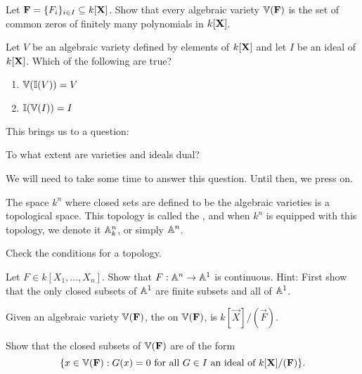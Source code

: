 \documentclass{ximera}
\begin{document}
\begin{exercise}
  Let $\mathbf{F} = \{F_i\}_{i\in I}\subseteq k[\mathbf X]$. Show that every
  algebraic variety $\mathbb V(\mathbf{F})$ is the set of common zeros of
  finitely many polynomials in $k[\mathbf X]$.
\end{exercise}

\begin{exercise}
  Let $V$ be an algebraic variety defined by elements of $k[\mathbf X]$ and
  let $I$ be an ideal of $k[\mathbf X]$. Which of the following are true?
  \begin{enumerate}
  \item $\mathbb V(\mathbb I(V)) = V$
  \item $\mathbb I(\mathbb V(I)) = I$
  \end{enumerate}
\end{exercise}


This brings us to a question:


\begin{question}
  To what extent are varieties and ideals dual?
\end{question}

We will need to take some time to answer this question. Until then, we
press on.




\begin{proposition}
  The space $k^n$ where closed sets are defined to be the algebraic
  varieties is a topological space. This topology is called the
  , and when $k^n$ is equipped with this
  topology, we denote it $\mathbb A_k^n$, or simply $\mathbb A^n$.
  \begin{sketch}
    Check the conditions for a topology.
  \end{sketch}
\end{proposition}

\begin{exercise}
  Let $F\in k[X_1,\dots,X_n]$. Show that $F:\mathbb A^n\to \mathbb A^1$ is
  continuous. Hint: First show that the only closed subsets of $\mathbb A^1$
  are finite subsets and all of $\mathbb A^1$.
\end{exercise}


\begin{definition}
  Given an algebraic variety $\mathbb V(\mathbf{F})$, the  on $\mathbb V(\mathbf{F})$, is $k[\vec{X}]/(\vec{F})$.
\end{definition}

\begin{exercise}
  Show that the closed subsets of $\mathbb V(\mathbf{F})$ are of the form
  \[
  \{x\in \mathbb V(\mathbf{F}): G(x) = 0\text{ for all $G \in I$ an ideal of $k[\mathbf{X}]/(\mathbf{F})$}\}.
  \]
\end{exercise}
\end{document}
